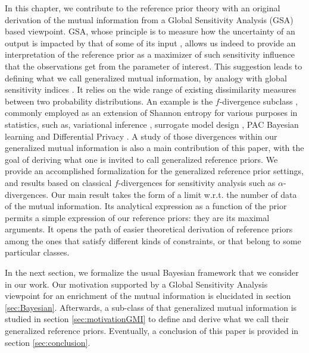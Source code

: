 In this chapter, we contribute to the reference prior theory with an original derivation of the mutual information from a Global Sensitivity Analysis (GSA) based viewpoint. %
GSA, whose principle is to measure how the uncertainty of an output is impacted by that of some of its input \citep{iooss_review_2015}, allows us indeed to provide %
an interpretation of the reference prior as a maximizer of such sensitivity influence that the observations get from the parameter of interest. 
This suggestion leads to defining what we call generalized mutual information, by analogy with global sensitivity indices \citep{da_veiga_basics_2021}. %
It relies on the wide range of existing dissimilarity measures between two probability distributions.
An example is the $f$-divergence subclass \citep{csiszar_information-type_1967}, commonly employed as an extension of  Shannon entropy for various purposes in statistics, such as, variational inference \citep{minka_divergence_2005,bach_sum--squares_2023}, surrogate model design \citep{nguyen_surrogate_2009}, PAC Bayesian learning \citep{picard-weibel_change_2022} and Differential Privacy \citep{mironov_renyi_2017}.
%
A study of those divergences within our generalized mutual information is {also} a main contribution of this paper, with the goal of deriving what one is invited to call generalized reference priors.
We provide an accomplished formalization for the generalized reference prior settings, and results based on classical $f$-divergences for sensitivity analysis such as $\alpha$-divergences.
{
Our main result takes the form of a limit w.r.t. the number of data of the mutual information. Its analytical expression as a function of the prior permits a simple expression of our reference priors: they are its maximal arguments. It opens the path of easier {theoretical} derivation of reference priors among the ones that satisfy different kinds of constraints, or that belong to some particular classes.}


In the next section, we formalize the usual Bayesian framework that we consider in our work. Our motivation supported by a Global Sensitivity Analysis viewpoint for an enrichment of the mutual information is elucidated in section \ref{sec:Bayesian}. Afterwards, a sub-class of that generalized mutual information is studied in section \ref{sec:motivationGMI} to define and derive what we call their generalized reference priors. 
Eventually, a conclusion of this paper is provided in section \ref{sec:conclusion}.







